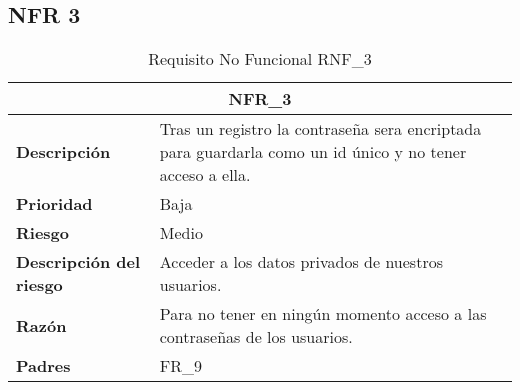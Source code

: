 \documentclass{scrreprt}
\begin{document}
\subsection{NFR 3}
    \begin{table}[H]
        \label{tab:my-table}
        \begin{tabular}{|p{5cm}|p{11cm}|}
        \hline
        \multicolumn{2}{|c|}{\textbf{NFR_3}} \\
        \hline
        \textbf{Descripción  }                      &  Tras un registro la contraseña sera encriptada para guardarla como un id único y no tener acceso a ella.                                                                      \\ \hline
        \textbf{Prioridad}                          & Baja                                                                                              \\ \hline
        \textbf{Riesgo}                          & Medio                                                                                                \\ \hline
        \textbf{Descripción del riesgo}                    &  Acceder a los datos privados de nuestros usuarios.                          \\ \hline
        \textbf{Razón}                   & Para no tener en ningún momento acceso a las contraseñas de los usuarios.  \\ \hline
        \textbf{Padres}                               &  FR_9\\  \hline
        \end{tabular}%
        
        \caption{Requisito No Funcional RNF_3}
\end{table}
\end{document}

